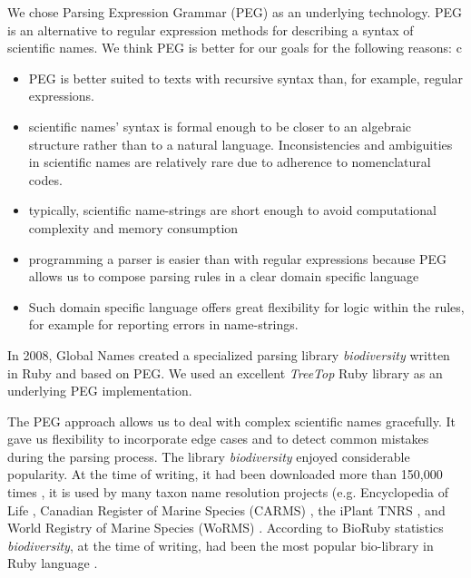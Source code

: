\documentclass{bmcart}
\begin{document}
We chose Parsing Expression Grammar (PEG) \cite{Ford2004} as an underlying
technology. PEG is an alternative to regular expression methods for describing a
syntax of scientific names. We think PEG is better for our goals for the
following reasons:
c%
\begin{itemize}

  \item PEG is better suited to texts with recursive syntax than, for example, regular expressions.

  \item scientific names' syntax is formal enough to be closer to an
    algebraic structure rather than to a natural language. Inconsistencies
    and ambiguities in scientific names are relatively rare due to adherence to
    nomenclatural codes.

  \item typically, scientific name-strings are short enough to avoid computational complexity and memory consumption

  \item programming a parser is easier than with regular
    expressions because PEG allows us to compose parsing rules in a clear domain
    specific language

  \item Such domain specific language offers great flexibility for logic within
    the rules, for example for reporting errors in name-strings.

\end{itemize}

In 2008, Global Names created a specialized parsing library \textit{biodiversity}
\cite{biodiversity} written in Ruby and based on PEG. We used an excellent
\textit{TreeTop} Ruby library \cite{treetop} as an underlying PEG
implementation.

The PEG approach allows us to deal with complex scientific names
gracefully.  It gave us flexibility to incorporate edge cases and to detect common mistakes  during the parsing process. The library
\textit{biodiversity} enjoyed considerable popularity. At the time of writing, it
had been downloaded more than 150,000 times \cite{bdiv-downloads}, it is used
by many taxon name resolution projects (e.g. Encyclopedia of Life
\cite{eol}, Canadian Register of Marine Species (CARMS) \cite{carms}, the
iPlant TNRS \cite{iplant}, and World Registry of Marine Species (WoRMS)
\cite{worms}.  According to BioRuby statistics \textit{biodiversity}, at the
time of writing, had been the most popular bio-library in Ruby language
\cite{biogems}.
\end{document}
